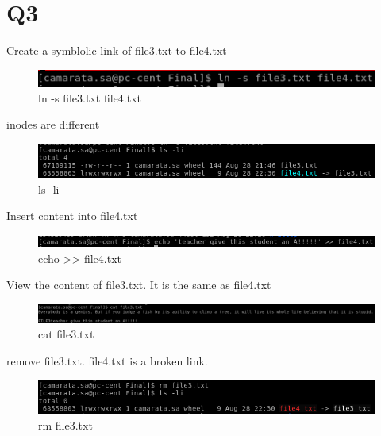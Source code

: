 \documentclass[10pt]{article}
\begin{document}
\section{Q3}
Create a symblolic link of file3.txt to file4.txt

\begin{figure}[H]
\centering
\includegraphics[scale=0.5]{./images/ss9.png}
\caption{ln -s file3.txt file4.txt}
\label{ln -s file3.txt file4.txt}
\end{figure}

inodes are different

\begin{figure}[H]
\centering
\includegraphics[scale=0.5]{./images/ss10.png}
\caption{ls -li}
\label{ls -li}
\end{figure}

Insert content into file4.txt

\begin{figure}[H]
\centering
\includegraphics[scale=0.5]{./images/ss11.png}
\caption{echo >> file4.txt}
\label{echo >> file4.txt}
\end{figure}

View the content of file3.txt.  It is the same as file4.txt

\begin{figure}[H]
\centering
\includegraphics[scale=0.5]{./images/ss12.png}
\caption{cat file3.txt}
\label{cat file3.txt}
\end{figure}

remove file3.txt.  file4.txt is a broken link.

\begin{figure}[H]
\centering
\includegraphics[scale=0.5]{./images/ss13.png}
\caption{rm file3.txt}
\label{rm file3.txt}
\end{figure}
\end{document}
